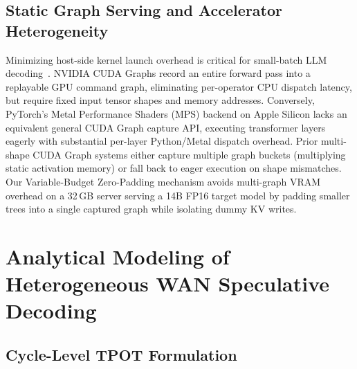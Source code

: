 \documentclass[10pt,conference]{IEEEtran}
\begin{document}
\subsection{Static Graph Serving and Accelerator Heterogeneity}

Minimizing host-side kernel launch overhead is critical for small-batch LLM decoding~\cite{kwon2023vllm,agrawal2024sarathi}. NVIDIA CUDA Graphs record an entire forward pass into a replayable GPU command graph, eliminating per-operator CPU dispatch latency, but require fixed input tensor shapes and memory addresses. Conversely, PyTorch's Metal Performance Shaders (MPS) backend on Apple Silicon lacks an equivalent general CUDA Graph capture API, executing transformer layers eagerly with substantial per-layer Python/Metal dispatch overhead. Prior multi-shape CUDA Graph systems either capture multiple graph buckets (multiplying static activation memory) or fall back to eager execution on shape mismatches. Our Variable-Budget Zero-Padding mechanism avoids multi-graph VRAM overhead on a 32\,GB server serving a 14B FP16 target model by padding smaller trees into a single captured graph while isolating dummy KV writes.

\section{Analytical Modeling of Heterogeneous WAN Speculative Decoding}

\subsection{Cycle-Level TPOT Formulation}
\end{document}
